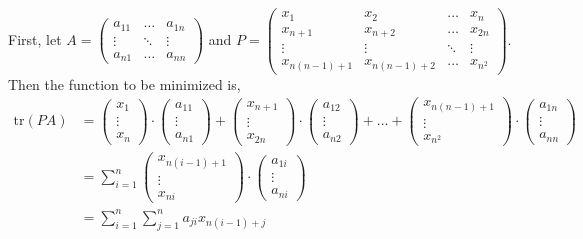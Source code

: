 \documentclass{article}
\begin{document}
\noindent First, let \(A = \begin{pmatrix}
    a_{11} & \hdots & a_{1n} \\
    \vdots & \ddots & \vdots \\
    a_{n1} & \hdots & a_{nn}
\end{pmatrix}\) and \(P = \begin{pmatrix}
    x_{1} & x_2 & \hdots & x_{n} \\
    x_{n + 1} & x_{n + 2} & \hdots & x_{2n} \\
    \vdots & \vdots & \ddots & \vdots \\
    x_{n(n-1)+1} & x_{n(n-1)+2} & \hdots & x_{n^2}
\end{pmatrix}\).
Then the function to be minimized is,
\begin{align*}
    \text{tr} (PA) &= \begin{pmatrix}
        x_1 \\
        \vdots \\
        x_n
    \end{pmatrix} \cdot \begin{pmatrix}
        a_{11}\\
        \vdots \\
        a_{n1}
    \end{pmatrix} + \begin{pmatrix}
        x_{n+1} \\
        \vdots \\
        x_{2n}
    \end{pmatrix} \cdot \begin{pmatrix}
        a_{12}\\
        \vdots \\
        a_{n2}
    \end{pmatrix} + \hdots + \begin{pmatrix}
        x_{n(n-1) + 1} \\
        \vdots \\
        x_{n^2}
    \end{pmatrix} \cdot \begin{pmatrix}
        a_{1n}\\
        \vdots \\
        a_{nn}
    \end{pmatrix} \\
    &= \sum_{i=1}^{n} \begin{pmatrix}
        x_{n(i-1) + 1} \\
        \vdots \\
        x_{ni}
    \end{pmatrix} \cdot \begin{pmatrix}
        a_{1i} \\
        \vdots \\
        a_{ni}
    \end{pmatrix} \\
    &= \sum_{i=1}^{n} \sum_{j=1}^{n} a_{ji}x_{n(i-1)+j}
\end{align*}
\end{document}
